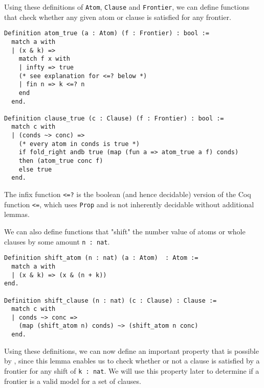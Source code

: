 Using these definitions of \lstinline{Atom}, \lstinline{Clause} and \lstinline{Frontier},
we can define functions that check whether any given atom or clause is satisfied for any frontier.

\begin{minipage}{\linewidth}
\begin{lstlisting}[language=Coq, label={lst:atom_clause_true_def}, caption={\lstinline{atom_true} and \lstinline{clause_true} in Coq}]
Definition atom_true (a : Atom) (f : Frontier) : bool :=
  match a with
  | (x & k) =>
    match f x with
    | infty => true
    (* see explanation for <=? below *)
    | fin n => k <=? n
    end
  end.

Definition clause_true (c : Clause) (f : Frontier) : bool :=
  match c with
  | (conds ~> conc) =>
    (* every atom in conds is true *)
    if fold_right andb true (map (fun a => atom_true a f) conds)
    then (atom_true conc f)
    else true
  end.
\end{lstlisting}
\end{minipage}

The infix function \lstinline{<=?} is the boolean (and hence decidable) version of the
Coq function \lstinline{<=}, which uses \lstinline{Prop} and is not inherently decidable without
additional lemmas.

We can also define functions that "shift" the number value of atoms or whole clauses by some amount \lstinline{n : nat}.

\begin{minipage}{\linewidth}
\begin{lstlisting}[language=Coq, label={lst:shift_atom_clause_true}, caption={\lstinline{shift_atom} and \lstinline{shift_clause} in Coq}]
Definition shift_atom (n : nat) (a : Atom)  : Atom :=
  match a with
  | (x & k) => (x & (n + k))
end.

Definition shift_clause (n : nat) (c : Clause) : Clause :=
  match c with
  | conds ~> conc =>
    (map (shift_atom n) conds) ~> (shift_atom n conc)
  end.
\end{lstlisting}
\end{minipage}

Using these definitions, we can now define an important property that is
possible by  \cite[p.~3]{mbezem}, since this lemma enables us to check whether or not a clause
is satisfied by a frontier for any shift of \lstinline{k : nat}.
We will use this property later to determine if a frontier is a valid model for a set of clauses.

